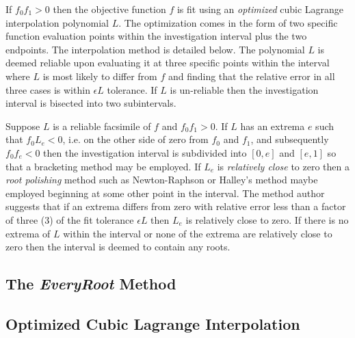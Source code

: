 If $f_0f_1 > 0$ then the objective function $f$ is fit using an \emph{optimized} cubic Lagrange interpolation polynomial $L$. The optimization comes in the form of two specific function evaluation points within the investigation interval plus the two endpoints. The interpolation method is detailed below. The polynomial $L$ is deemed reliable upon evaluating it at three specific points within the interval where $L$ is most likely to differ from $f$ and finding that the relative error in all three cases is within $\epsilon L$ tolerance. If $L$ is un-reliable then the investigation interval is bisected into two subintervals. %

Suppose $L$ is a reliable facsimile of $f$ and $f_0f_1 > 0$. If $L$ has an extrema $e$ such that $f_0L_e < 0$, i.e. on the other side of zero from $f_0$ and $f_1$, and subsequently $f_0f_e < 0$ then the investigation interval is subdivided into $[0,e]$ and $[e,1]$ so that a bracketing method may be employed. If $L_e$ is \emph{relatively close} to zero then a \emph{root polishing} method such as Newton-Raphson or Halley's method maybe employed beginning at some other point in the interval. The method author suggests that if an extrema differs from zero with relative error less than a factor of three (3) of the fit tolerance $\epsilon L$ then $L_e$ is relatively close to zero. If there is no extrema of $L$ within the interval or none of the extrema are relatively close to zero then the interval is deemed to contain any roots.

\subsection{The \emph{EveryRoot} Method}

\subsection{Optimized Cubic Lagrange Interpolation}

